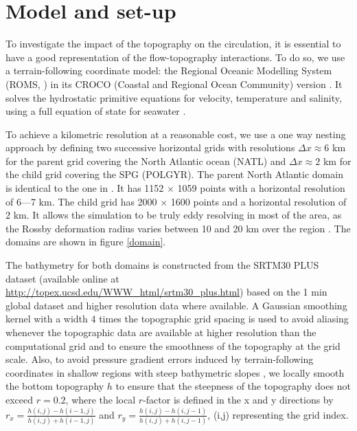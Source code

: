 \documentclass{ametsoc}
\begin{document}




\section{Model and set-up}


To investigate the impact of the topography on the circulation, it is essential to have a good representation of the flow-topography interactions. To do so, we use a terrain-following coordinate model: the Regional Oceanic Modelling System (ROMS, \citet{shchepetkin2009}) in its CROCO (Coastal and Regional Ocean Community) version \citep{debreu2012}. It solves the hydrostatic primitive equations for velocity, temperature and salinity, using a full equation of state for seawater \citep{shchepetkin2009,shchepetkin2011}. 

To achieve a kilometric resolution at a reasonable cost, we use a one way nesting approach by defining two successive horizontal grids with resolutions $\Delta x \approx 6$ km for the parent grid covering the North Atlantic ocean (NATL) and $\Delta x \approx 2$ km for the child grid covering the SPG (POLGYR). The parent North Atlantic domain is identical to the one in \cite{renault2016}. It has 1152 $\times$ 1059 points  with a horizontal resolution of 6---7 km. The child grid has 2000 $\times$ 1600 points and a horizontal resolution of 2 km. It allows the simulation to be truly eddy resolving in most of the area, as the Rossby deformation radius varies between 10 and 20 km over the region \citep{chelton1998}. The domains are shown in figure \ref{domain}. 

The bathymetry for both domains is constructed from the SRTM30 PLUS dataset (available online at \url{http://topex.ucsd.edu/WWW_html/srtm30_plus.html}) based on the 1 min \cite{sandwell1997} global dataset and higher resolution data where available. A Gaussian smoothing kernel with a width 4 times the topographic grid spacing is used to avoid aliasing whenever the topographic data are available at higher resolution than the computational grid and to ensure the smoothness of the topography at the grid scale. Also, to avoid pressure gradient errors induced by terrain-following coordinates in shallow regions with steep bathymetric slopes \citep{beckmann1993}, we locally smooth the bottom topography $h$ to ensure that the steepness of the topography does not exceed $r=0.2$, where the local $r$-factor is defined in the x and y directions by $r_x = \frac{h(i,j)-h(i-1,j)}{h(i,j)+h(i-1,j)}$ and $r_y = \frac{h(i,j)-h(i,j-1)}{h(i,j)+h(i,j-1)}$, (i,j) representing the grid index.
\end{document}
